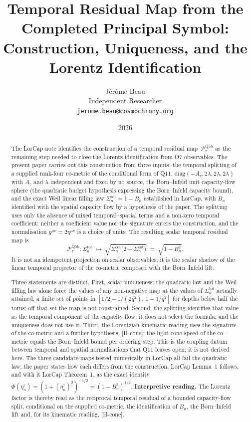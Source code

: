 \documentclass[11pt,a4paper]{article}
\title{Temporal Residual Map from the Completed Principal Symbol:\\
Construction, Uniqueness, and the Lorentz Identification}
\author{J\'er\^ome Beau\\
\small Independent Researcher\\
\small \texttt{jerome.beau@cosmochrony.org}}
\date{2026}
\begin{document}
  \maketitle

  \begin{abstract}
    The LorCap note identifies the construction of a temporal residual
    map~$\mathcal{P}_\tau^{\mathrm{Q5b}}$ as the remaining step needed to close the Lorentz
    identification from O7 observables.
    The present paper carries out this construction from three inputs:
    the temporal splitting of a supplied rank-four co-metric of the conditional form of Q11,
    $\mathrm{diag}(-A_\tau, 2\lambda, 2\lambda, 2\lambda)$ with $A_\tau$ and $\lambda$ independent and fixed by no
    source,
    the Born--Infeld unit capacity-flow sphere (the quadratic budget hypothesis expressing
    the Born--Infeld capacity bound), and
    the exact Weil linear filling law $\Sigma_n^{\mathrm{tot}} = 1 - B_n$
    established in LorCap, with $B_n$ identified with the spatial capacity flow by a hypothesis of the paper.
    The splitting uses only the absence of mixed temporal--spatial terms and a non-zero temporal coefficient; neither a coefficient value nor the
    signature enters the construction, and the normalisation $g^{\mu\nu} = 2\eta^{\mu\nu}$ is a choice of units.
    The resulting scalar temporal residual map is
    \[
      \mathcal{P}_\tau^{\mathrm{Q5b}} \colon \Sigma_n^{\mathrm{tot}}
      \;\longmapsto\; \sqrt{\Sigma_n^{\mathrm{tot}}\bigl(2 - \Sigma_n^{\mathrm{tot}}\bigr)}
      \;=\; \sqrt{1 - B_n^2}.
    \]
    It is not an idempotent projection on scalar observables; it is the scalar shadow
    of the linear temporal projector of the co-metric composed with the Born--Infeld lift.

    Three statements are distinct.
    First, scalar uniqueness: the quadratic law and the Weil filling law alone force the values of any
    non-negative map at the values of $\Sigma_n^{\mathrm{tot}}$ actually attained, a finite set of points in
    $[1/2 - 1/(2q^2),\, 1 - 1/q^2]$ for depths below half the torus; off that set the map is not constrained.
    Second, the splitting identifies that value as the temporal component of the capacity flow; it does not
    select the formula, and the uniqueness does not use it.
    Third, the Lorentzian kinematic reading uses the signature of the co-metric and a further hypothesis,
    [H-cone]: the light-cone speed of the co-metric equals the Born--Infeld bound per ordering step.
    This is the coupling datum between temporal and spatial normalisations that Q11 leaves open; it is not derived
    here.
    The three candidate maps tested numerically in LorCap all fail the quadratic law; the paper states how each
    differs from the construction.
    LorCap Lemma~1 follows, and with it LorCap Theorem~1, as the exact identity
    $\Phi(\eta_n^\tau) = (1+(\eta_n^\tau)^2)^{-1/2} = (1-B_n^2)^{1/2}$.
    \textbf{Interpretive reading.}
    The Lorentz factor is thereby read as the reciprocal temporal residual of a bounded
    capacity-flow split, conditional on the supplied co-metric, the identification of $B_n$, the Born--Infeld lift
    and, for its kinematic reading, [H-cone].
  \end{abstract}
\end{document}
